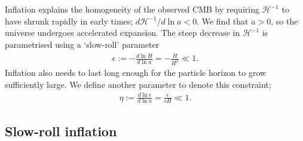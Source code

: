 Inflation explains the homogeneity of the observed CMB by requiring $\mathcal{H}^{-1}$ to have shrunk rapidly in early times; $d\mathcal{H}^{-1}/d\ln a < 0$. We find that $\ddot{a} > 0$, so the universe undergoes accelerated expansion. The steep decrease in $\mathcal{H}^{-1}$ is parametrised using a `slow-roll' parameter
\begin{align}
	\epsilon := - \frac{d\ln H}{d\ln a} = -\frac{\dot{H}}{H^2} \ll 1. \label{def:slow_roll_epsilon}
\end{align}
Inflation also needs to last long enough for the particle horizon to grow sufficiently large. We define another parameter to denote this constraint;
\begin{align}
	\eta := \frac{d\ln \epsilon}{d\ln a} = \frac{\dot{\epsilon}}{\epsilon H} \ll 1. \label{def:slow_roll_eta}
\end{align}


\subsection{Slow-roll inflation}
\label{section:slow-roll_inflation}


